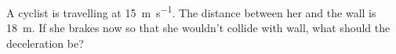 \documentclass[a4paper]{tufte-handout}
\newenvironment{TaskBox} %
{\begin{tcolorbox}[breakable,colback=b1!30,colframe=b1,title=Task]} {\end{tcolorbox}}
\begin{document}
\begin{TaskBox}
A cyclist is travelling at \SI{15}{\m \per \second}. The distance between her and the wall is \SI{18}{\m}. If she brakes now so that she wouldn't collide with wall, what should the deceleration be?
\vspace{0.5in}
\end{TaskBox}
\end{document}
